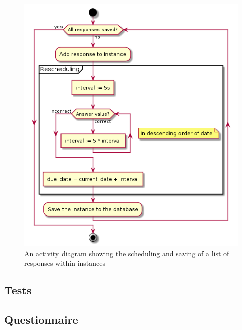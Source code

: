 \begin{figure}[h!]
\centering
    \includegraphics[width=.8\textwidth]{img/learningserver.png}
\caption{An activity diagram showing the scheduling and saving of a list of responses within instances}
\label{fig:learningserver}
\end{figure}

\subsection{Tests}

\subsection{Questionnaire}
